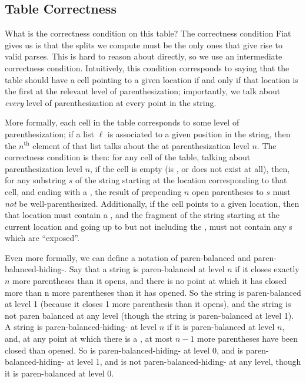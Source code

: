     
  \subsection{Table Correctness}
    What is the correctness condition on this table?  The correctness condition Fiat gives us is that the splits we compute must be the only ones that give rise to valid parses.  This is hard to reason about directly, so we use an intermediate correctness condition.  Intuitively, this condition corresponds to saying that the table should have a cell pointing to a given location if and only if that location is the first \terminal{+} at the relevant level of parenthesization; importantly, we talk about \emph{every} level of parenthesization at every point in the string.
    
    More formally, each cell in the table corresponds to some level of parenthesization; if a list $\ell$ is associated to a given position in the string, then the $n^{\text{th}}$ element of that list talks about the \terminal{+} at parenthesization level $n$.  The correctness condition is then: for any cell of the table, talking about parenthesization level $n$, if the cell is empty (is \nullentry, or does not exist at all), then, for any substring $s$ of the string starting at the location corresponding to that cell, and ending with a \terminal{+}, the result of prepending $n$ open parentheses to $s$ must \emph{not} be well-parenthesized.   Additionally, if the cell points to a given location, then that location must contain a \terminal{+}, and the fragment of the string starting at the current location and going up to but not including the \terminal{+}, must not contain any \terminal{+}s which are ``exposed''.
    
    Even more formally, we can define a notation of paren-balanced and paren-balanced-hiding-\terminal{+}.  Say that a string is paren-balanced at level $n$ if it closes exactly $n$ more parentheses than it opens, and there is no point at which it has closed more than n more parentheses than it has opened.  So the string  is paren-balanced at level 1 (because it closes 1 more parenthesis than it opens), and the string  is not paren balanced at any level (though the string  is paren-balanced at level 1).  A string is paren-balanced-hiding-\terminal{+} at level $n$ if it is paren-balanced at level $n$, and, at any point at which there is a \terminal{+}, at most $n-1$ more parentheses have been closed than opened.  So  is paren-balanced-hiding-\terminal{+} at level 0, and  is paren-balanced-hiding-\terminal{+} at level 1, and  is not paren-balanced-hiding-\terminal{+} at any level, though it is paren-balanced at level 0.  
    

